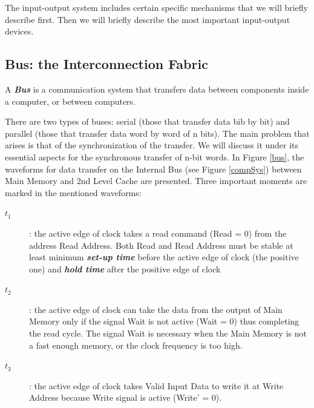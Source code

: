 The input-output system includes certain specific mechanisms that we will briefly describe first. Then we will briefly describe the most important input-output devices.

\subsection{Bus: the Interconnection Fabric}

A {\bf {\em Bus}} is a communication system that transfers data between components inside a computer, or between computers. 

There are two types of buses: serial (those that transfer data bib by bit) and parallel (those that transfer data word by word of n bits). The main problem that arises is that of the synchronization of the transfer. We will discuss it under its essential aspects for the synchronous transfer of n-bit words.
In Figure \ref{bus}, the waveforms for data transfer on the Internal Bus (see Figure \ref{compSys}) between Main Memory and 2nd Level Cache are presented. Three important moments are marked in the mentioned waveforms:


\begin{description}
    \item[$t_1$]: the active edge of clock takes a read command (Read = 0) from the address Read Address. Both Read and Read Address must be stable at least minimum {\bf {\em  set-up time}} before the active edge of clock (the positive one) and {\bf {\em hold time}} after the positive edge of clock
    \item[$t_2$]: the active edge of clock can take the data from the output of Main Memory only if the signal Wait is not active (Wait = 0) thus completing the read cycle. The signal Wait is necessary when the Main Memory is not a fast enough memory, or the clock frequency is too high.
    \item[$t_3$]: the active edge of clock takes Valid Input Data to write it at Write Address because Write signal is active (Write' = 0).
\end{description}


